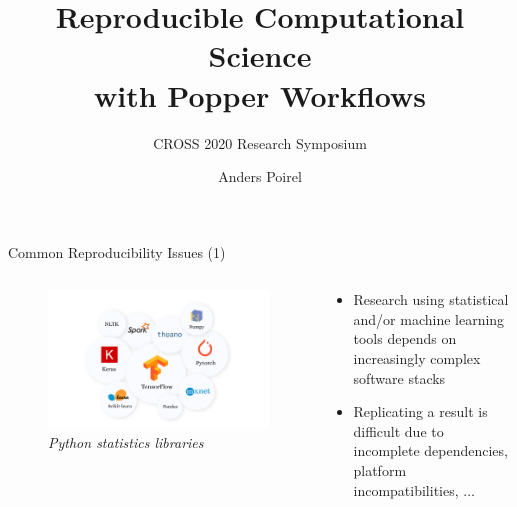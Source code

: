 \documentclass[aspectratio=169, 10pt]{beamer}
\title{Reproducible Computational Science\\ with Popper Workflows}
\subtitle{CROSS 2020 Research Symposium}
\author{Anders Poirel}
\date{}
\institute{ University of California, Santa Cruz}
\begin{document}
\maketitle

\begin{frame}{Common Reproducibility Issues (1)}
    \begin{columns}
        \begin{column}{0.5\textwidth}  %
            \begin{center}
                \begin{figure}
                    \includegraphics[width=1.1\textwidth]{images/libraries.png}
                    \caption*{{\sl Python statistics libraries}}
                \end{figure}
            \end{center}
        \end{column}
        \begin{column}{0.5\textwidth}
            \begin{itemize}
                \item Research using statistical and/or machine learning tools
                depends on increasingly complex software stacks
                \item Replicating a result is difficult due to 
                incomplete dependencies, platform incompatibilities, $\ldots$ 
            \end{itemize}
        \end{column}
    \end{columns}
\end{frame}
\end{document}
